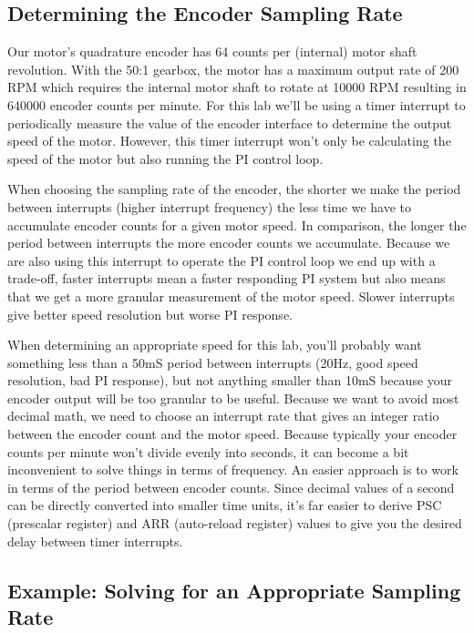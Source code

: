 \documentclass[openany,11pt,fleqn]{book} %
\begin{document}
\subsection{Determining the Encoder Sampling Rate} \label{encoder_example}

Our motor's quadrature encoder has 64 counts per (internal) motor shaft revolution. With the 50:1 gearbox, the motor has a maximum output rate of 200 RPM which requires the internal motor shaft to rotate at 10000 RPM resulting in 640000 encoder counts per minute. For this lab we'll be using a timer interrupt to periodically measure the value of the encoder interface to determine the output speed of the motor. However, this timer interrupt won't only be calculating the speed of the motor but also running the PI control loop.

When choosing the sampling rate of the encoder, the shorter we make the period between interrupts (higher interrupt frequency) the less time we have to accumulate encoder counts for a given motor speed. In comparison, the longer the period between interrupts the more encoder counts we accumulate. 
Because we are also using this interrupt to operate the PI control loop we end up with a trade-off, faster interrupts mean a faster responding PI system but also means that we get a more granular measurement of the motor speed. Slower interrupts give better speed resolution but worse PI response.

When determining an appropriate speed for this lab, you'll probably want something less than a 50mS period between interrupts (20Hz, good speed resolution, bad PI response), but not anything smaller than 10mS because your encoder output will be too granular to be useful. Because we want to avoid most decimal math, we need to choose an interrupt rate that gives an integer ratio between the encoder count and the motor speed. Because typically your encoder counts per minute won't divide evenly into seconds, it can become a bit inconvenient to solve things in terms of frequency. An easier approach is to work in terms of the period between encoder counts. Since decimal values of a second can be directly converted into smaller time units, it's far easier to derive PSC (prescalar register) and ARR (auto-reload register) values to give you the desired delay between timer interrupts.


\subsection{Example: Solving for an Appropriate Sampling Rate}
\end{document}
